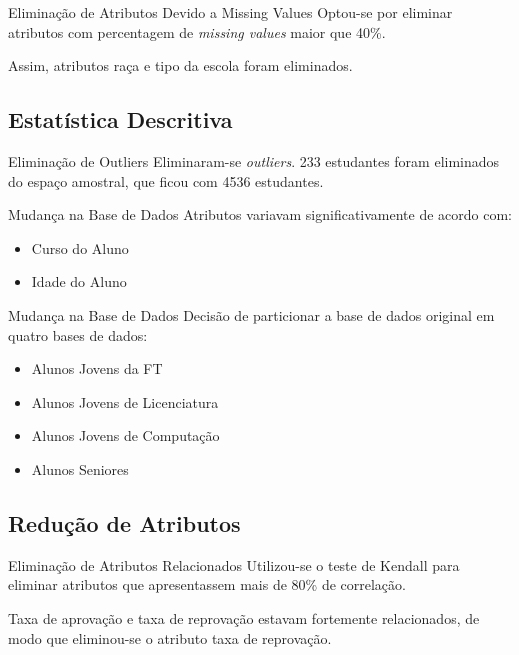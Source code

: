 \begin{frame}{Eliminação de Atributos Devido a Missing Values}
    Optou-se por eliminar atributos com percentagem de \textit{missing values} maior que 40\%.
        
    \vspace{0.5cm}
    
    Assim, atributos raça e tipo da escola foram eliminados. 
\end{frame}

\subsection{Estatística Descritiva}
\begin{frame}{Eliminação de Outliers}
    Eliminaram-se \textit{outliers}. 233 estudantes foram eliminados do espaço amostral,
    que ficou com 4536 estudantes.  
\end{frame}

\begin{frame}{Mudança na Base de Dados}
    Atributos variavam significativamente de acordo com: 
    \begin{itemize}
        \item Curso do Aluno
        \item Idade do Aluno
    \end{itemize}
\end{frame}

\begin{frame}{Mudança na Base de Dados}
    Decisão de particionar a base de dados original em quatro bases de dados:
    \begin{itemize}
        \item Alunos Jovens da FT
        \item Alunos Jovens de Licenciatura
        \item Alunos Jovens de Computação
        \item Alunos Seniores
    \end{itemize}
\end{frame}

\subsection{Redução de Atributos}
\begin{frame}{Eliminação de Atributos Relacionados}
    Utilizou-se o teste de Kendall para eliminar atributos que apresentassem mais de
    80\% de correlação. 

    \vspace{0.5cm}

    Taxa de aprovação e taxa de reprovação estavam fortemente relacionados, de modo
    que eliminou-se o atributo taxa de reprovação. 
\end{frame}

